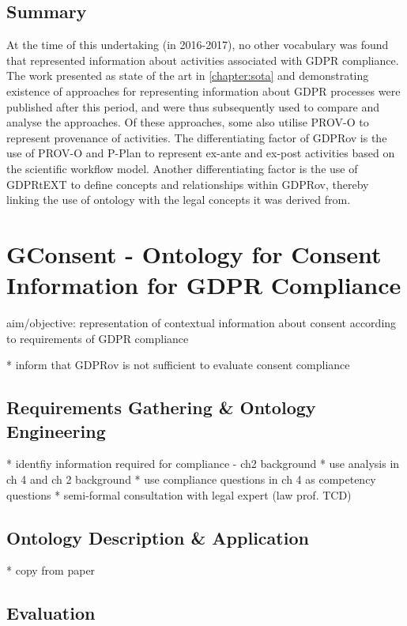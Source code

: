 \subsection*{Summary}
At the time of this undertaking (in 2016-2017), no other vocabulary was found that represented information about activities associated with GDPR compliance.
The work presented as state of the art in \autoref{chapter:sota} and demonstrating existence of approaches for representing information about GDPR processes were published after this period, and were thus subsequently used to compare and analyse the approaches. Of these approaches, some also utilise PROV-O to represent provenance of activities. The differentiating factor of GDPRov is the use of PROV-O and P-Plan to represent ex-ante and ex-post activities based on the scientific workflow model. Another differentiating factor is the use of GDPRtEXT to define concepts and relationships within GDPRov, thereby linking the use of ontology with the legal concepts it was derived from.

\section{GConsent - Ontology for Consent Information for GDPR Compliance}\label{sec:voc:GConsent}

aim/objective: representation of contextual information about consent according to requirements of GDPR compliance

* inform that GDPRov is not sufficient to evaluate consent compliance

\subsection{Requirements Gathering \& Ontology Engineering}

* identfiy information required for compliance - ch2 background
* use analysis in ch 4 and ch 2 background
* use compliance questions in ch 4 as competency questions
* semi-formal consultation with legal expert (law prof. TCD)

\subsection{Ontology Description \& Application}

* copy from paper

\subsection{Evaluation}

